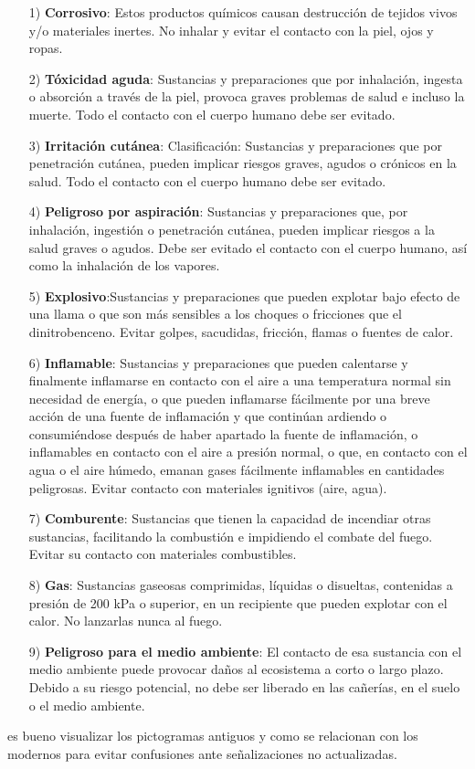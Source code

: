 \begin{itemize}
    \item[1)]  \textbf{\textcolor{morado}{Corrosivo}}: Estos productos químicos causan destrucción de tejidos vivos y/o materiales inertes. No inhalar y evitar el contacto con la piel, ojos y ropas.
    \item[2)]  \textbf{\textcolor{morado}{Tóxicidad aguda}}: Sustancias y preparaciones que por inhalación, ingesta o absorción a través de la piel, provoca graves problemas de salud e incluso la muerte. Todo el contacto con el cuerpo humano debe ser evitado. 
    \item[3)]  \textbf{\textcolor{morado}{Irritación cutánea}}: Clasificación: Sustancias y preparaciones que por penetración cutánea, pueden implicar riesgos graves, agudos o crónicos en la salud. Todo el contacto con el cuerpo humano debe ser evitado.
    \item[4)]  \textbf{\textcolor{morado}{Peligroso por aspiración}}: Sustancias y preparaciones que, por inhalación, ingestión o penetración cutánea, pueden implicar riesgos a la salud graves o agudos. Debe ser evitado el contacto con el cuerpo humano, así como la inhalación de los vapores. 
    \item[5)]  \textbf{\textcolor{morado}{Explosivo}}:Sustancias y preparaciones que pueden explotar bajo efecto de una llama o que son más sensibles a los choques o fricciones que el dinitrobenceno. Evitar golpes, sacudidas, fricción, flamas o fuentes de calor. 
    \item[6)]  \textbf{\textcolor{morado}{Inflamable}}: Sustancias y preparaciones que pueden calentarse y finalmente inflamarse en contacto con el aire a una temperatura normal sin necesidad de energía, o que pueden inflamarse fácilmente por una breve acción de una fuente de inflamación y que continúan ardiendo o consumiéndose después de haber apartado la fuente de inflamación, o inflamables en contacto con el aire a presión normal, o que, en contacto con el agua o el aire húmedo, emanan gases fácilmente inflamables en cantidades peligrosas. Evitar contacto con materiales ignitivos (aire, agua). 
    \item[7)]  \textbf{\textcolor{morado}{Comburente}}: Sustancias que tienen la capacidad de incendiar otras sustancias, facilitando la combustión e impidiendo el combate del fuego. Evitar su contacto con materiales combustibles. 
    \item[8)]  \textbf{\textcolor{morado}{Gas}}: Sustancias gaseosas comprimidas, líquidas o disueltas, contenidas a presión de 200 kPa o superior, en un recipiente que pueden explotar con el calor. No lanzarlas nunca al fuego.
    \item[9)]  \textbf{\textcolor{morado}{Peligroso para el medio ambiente}}: El contacto de esa sustancia con el medio ambiente puede provocar daños al ecosistema a corto o largo plazo. Debido a su riesgo potencial, no debe ser liberado en las cañerías, en el suelo o el medio ambiente. 
\end{itemize}
es bueno visualizar los pictogramas antiguos y como se relacionan con los modernos para evitar confusiones ante señalizaciones no actualizadas.

